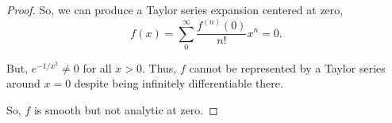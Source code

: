 \documentclass[../hw1]{subfiles}
\begin{document}
\begin{proof}

	So, we can produce a Taylor series expansion centered at zero, \[
		f(x)=\sum_{0}^{\infty} \frac{f^{(n)}(0)}{n!}x^n = 0
		.\]

	But, $e^{-1 / x^2}\neq 0$ for all $x>0$.
	Thus,  $f$ cannot be represented by a Taylor series around  $x=0$ despite being infinitely differentiable there.

	So, $f$ is smooth but not analytic at zero.
\end{proof}
\end{document}
